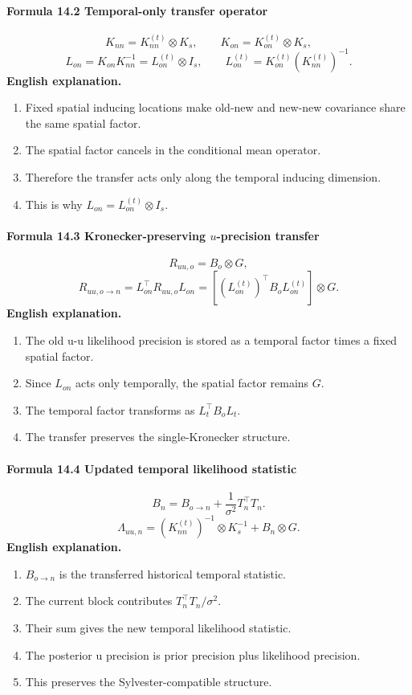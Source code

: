 \documentclass[12pt]{article}
\begin{document}
\paragraph{Formula 14.2 Temporal-only transfer operator}
\[
K_{nn}=K_{nn}^{(t)}\otimes K_s,
\qquad
K_{on}=K_{on}^{(t)}\otimes K_s,
\]
\[
L_{on}=K_{on}K_{nn}^{-1}
=L_{on}^{(t)}\otimes I_s,
\qquad
L_{on}^{(t)}=K_{on}^{(t)}(K_{nn}^{(t)})^{-1}.
\]
\textbf{English explanation.}
\begin{enumerate}[leftmargin=2em]
\item Fixed spatial inducing locations make old-new and new-new covariance share the same spatial factor.
\item The spatial factor cancels in the conditional mean operator.
\item Therefore the transfer acts only along the temporal inducing dimension.
\item This is why \(L_{on}=L_{on}^{(t)}\otimes I_s\).
\end{enumerate}

\paragraph{Formula 14.3 Kronecker-preserving \(u\)-precision transfer}
\[
R_{uu,o}=B_o\otimes G,
\]
\[
R_{uu,o\rightarrow n}
=L_{on}^\top R_{uu,o}L_{on}
=\left[(L_{on}^{(t)})^\top B_oL_{on}^{(t)}\right]\otimes G.
\]
\textbf{English explanation.}
\begin{enumerate}[leftmargin=2em]
\item The old u-u likelihood precision is stored as a temporal factor times a fixed spatial factor.
\item Since \(L_{on}\) acts only temporally, the spatial factor remains \(G\).
\item The temporal factor transforms as \(L_t^\top B_oL_t\).
\item The transfer preserves the single-Kronecker structure.
\end{enumerate}

\paragraph{Formula 14.4 Updated temporal likelihood statistic}
\[
B_n=
B_{o\rightarrow n}
+
\frac1{\sigma^2}T_n^\top T_n.
\]
\[
\Lambda_{uu,n}
=
(K_{nn}^{(t)})^{-1}\otimes K_s^{-1}
+
B_n\otimes G.
\]
\textbf{English explanation.}
\begin{enumerate}[leftmargin=2em]
\item \(B_{o\rightarrow n}\) is the transferred historical temporal statistic.
\item The current block contributes \(T_n^\top T_n/\sigma^2\).
\item Their sum gives the new temporal likelihood statistic.
\item The posterior u precision is prior precision plus likelihood precision.
\item This preserves the Sylvester-compatible structure.
\end{enumerate}
\end{document}
